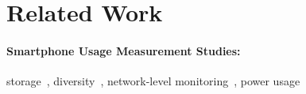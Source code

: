 \section{Related Work}
\label{sec:related}

\paragraph{Smartphone Usage Measurement Studies:} storage~\cite{kim:fast:2012},
diversity~\cite{falaki:mobisys:2010}, network-level
monitoring~\cite{xu:imc:2011}, power usage~\cite{shye:micro:2009}

